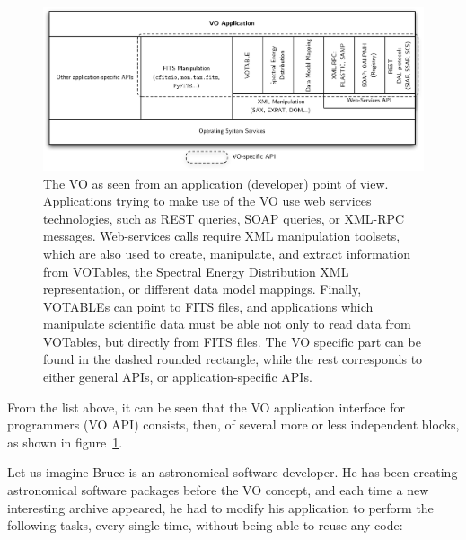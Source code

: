 		\begin{figure}[tbhp]
			\centering
				\includegraphics[width=\columnwidth]
				{fig/VOAPIStack.pdf}
			\caption[Application view of the VO]{
				The VO as seen from an application (developer)
				point of view. Applications trying to make use of
				the VO use web services technologies, such as REST
				queries, SOAP queries, or XML-RPC messages.
				Web-services calls require XML manipulation
				toolsets, which are also used to create, manipulate,
				and extract information from VOTables, the Spectral
				Energy Distribution XML representation, or
				different data model mappings. Finally, VOTABLEs
				can point to FITS files, and applications which
				manipulate scientific data must be able not only to
				read data from VOTables, but directly from FITS
				files. The VO specific part can be found in the
				dashed rounded rectangle, while the rest
				corresponds to either general APIs, or
				application-specific APIs.
			}
			\label{fig:fig_VOAPIStack}
		\end{figure}

		From the list above, it can be seen that the VO application
		interface for programmers (VO API) consists, then, of
		several more or less independent blocks, as shown in
		figure~\ref{fig:fig_VOAPIStack}.


		Let us imagine Bruce is an astronomical software developer.
		He has been creating astronomical software packages before
		the VO concept, and each time a new interesting archive
		appeared, he had to modify his application to perform the
		following tasks, every single time, without being able to
		reuse any code:


